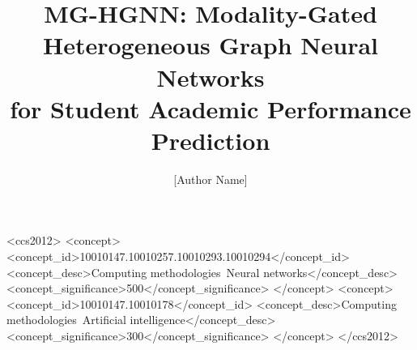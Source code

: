 \documentclass[sigconf]{acmart}
\begin{document}
\title{MG-HGNN: Modality-Gated Heterogeneous Graph Neural Networks\\
       for Student Academic Performance Prediction}

\author{[Author Name]}

\begin{CCSXML}
<ccs2012>
  <concept>
    <concept_id>10010147.10010257.10010293.10010294</concept_id>
    <concept_desc>Computing methodologies~Neural networks</concept_desc>
    <concept_significance>500</concept_significance>
  </concept>
  <concept>
    <concept_id>10010147.10010178</concept_id>
    <concept_desc>Computing methodologies~Artificial intelligence</concept_desc>
    <concept_significance>300</concept_significance>
  </concept>
</ccs2012>
\end{CCSXML}


\end{document}
